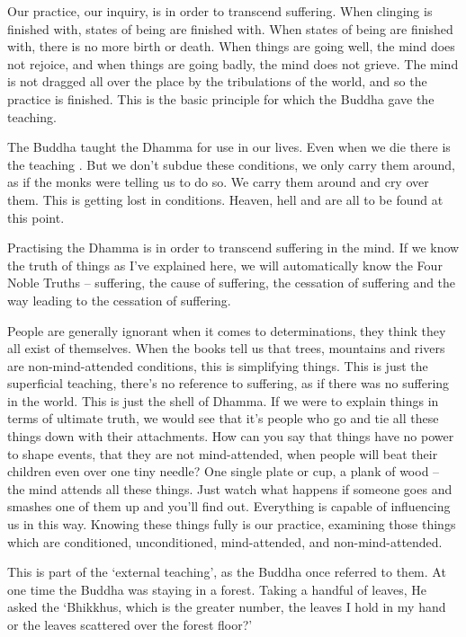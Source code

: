 Our practice, our inquiry, is in order to transcend suffering. When clinging is finished with, states of being are finished with. When states of being are finished with, there is no more birth or death. When things are going well, the mind does not rejoice, and when things are going badly, the mind does not grieve. The mind is not dragged all over the place by the tribulations of the world, and so the practice is finished. This is the basic principle for which the Buddha gave the teaching.

The Buddha taught the Dhamma for use in our lives. Even when we die there is the teaching . But we don't subdue these conditions, we only carry them around, as if the monks were telling us to do so. We carry them around and cry over them. This is getting lost in conditions. Heaven, hell and  are all to be found at this point.

Practising the Dhamma is in order to transcend suffering in the mind. If we know the truth of things as I've explained here, we will automatically know the Four Noble Truths -- suffering, the cause of suffering, the cessation of suffering and the way leading to the cessation of suffering.

People are generally ignorant when it comes to determinations, they think they all exist of themselves. When the books tell us that trees, mountains and rivers are non-mind-attended conditions, this is simplifying things. This is just the superficial teaching, there's no reference to suffering, as if there was no suffering in the world. This is just the shell of Dhamma. If we were to explain things in terms of ultimate truth, we would see that it's people who go and tie all these things down with their attachments. How can you say that things have no power to shape events, that they are not mind-attended, when people will beat their children even over one tiny needle? One single plate or cup, a plank of wood -- the mind attends all these things. Just watch what happens if someone goes and smashes one of them up and you'll find out. Everything is capable of influencing us in this way. Knowing these things fully is our practice, examining those things which are conditioned, unconditioned, mind-attended, and non-mind-attended.

This is part of the `external teaching', as the Buddha once referred to them. At one time the Buddha was staying in a forest. Taking a handful of leaves, He asked the  `Bhikkhus, which is the greater number, the leaves I hold in my hand or the leaves scattered over the forest floor?'

